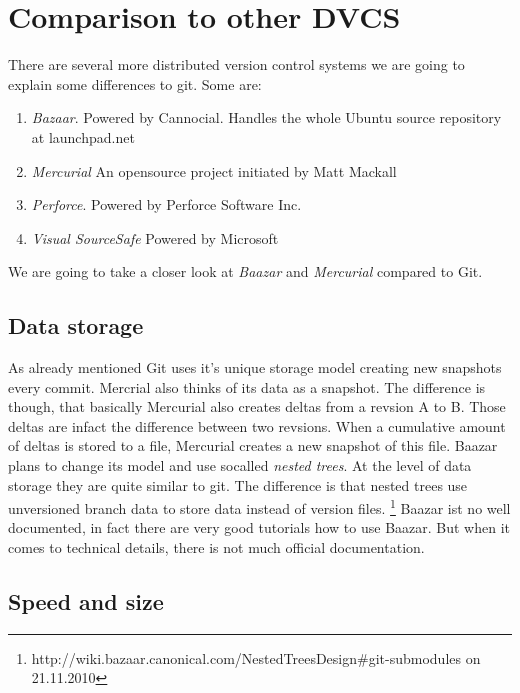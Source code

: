 \section {Comparison to other DVCS}\label{comparisontootherdvcs}

There are several more distributed version control systems
we are going to explain some differences to git.
Some are:

  \begin{enumerate}
     \item \emph{Bazaar}. Powered by Cannocial. Handles the whole Ubuntu source
     repository at launchpad.net
     \item \emph{Mercurial} An opensource project initiated by Matt Mackall
     \item \emph{Perforce}. Powered by Perforce Software Inc.
     \item \emph{Visual SourceSafe} Powered by Microsoft
  \end{enumerate}
  
We are going to take a closer look at \emph{Baazar} and \emph{Mercurial} 
compared to Git.

\subsection {Data storage}

As already mentioned Git uses it's unique storage model creating new snapshots
every commit. Mercrial also thinks of its data as a snapshot. The difference
is though, that basically Mercurial also creates deltas from a revsion A to B.
Those deltas are infact the difference between two revsions. When a cumulative
amount of deltas is stored to a file, Mercurial creates a new snapshot of this file. 
\cite[Chapter 4]{hgbook2009} Baazar plans to change its model and use socalled \emph{nested trees}. At the level of data storage they are quite similar to git. The difference is that nested trees use unversioned branch data to store data instead of version files. \footnote{ http://wiki.bazaar.canonical.com/NestedTreesDesign\#git-submodules on 21.11.2010 } Baazar ist no well documented, in fact there are very good tutorials how to use Baazar. But when it comes to technical details, there is not much official documentation.

\subsection {Speed and size}

